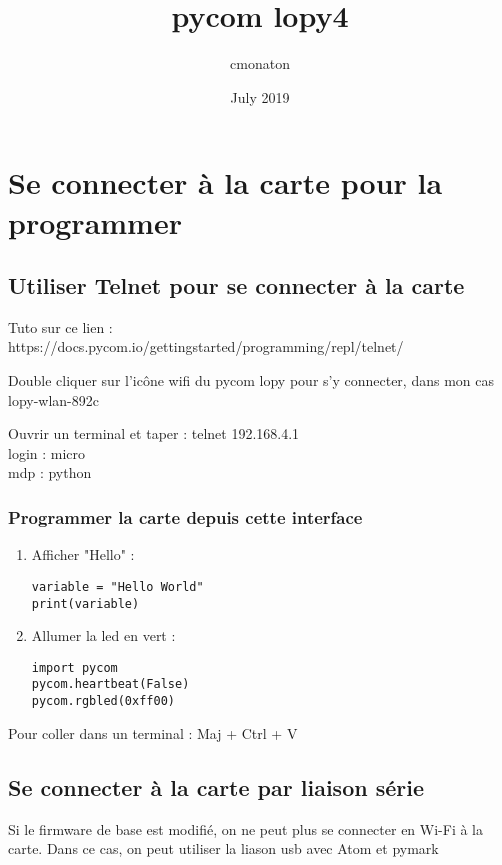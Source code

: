 \documentclass{article}
\title{pycom lopy4}
\author{cmonaton }
\date{July 2019}
\begin{document}
\maketitle

\section{Se connecter à la carte pour la programmer}

\subsection{Utiliser Telnet pour se connecter à la carte}

Tuto sur ce lien : https://docs.pycom.io/gettingstarted/programming/repl/telnet/

Double cliquer sur l'icône wifi du pycom lopy pour s'y connecter, dans mon cas lopy-wlan-892c

Ouvrir un terminal et taper : telnet 192.168.4.1 \\
login : micro \\
mdp : python \\

\subsubsection{Programmer la carte depuis cette interface}


\begin{enumerate}
    \item Afficher "Hello" : 
    \begin{verbatim}
variable = "Hello World"
print(variable) 
    \end{verbatim}

    \item Allumer la led en vert : 
    
 \begin{verbatim}
import pycom
pycom.heartbeat(False)
pycom.rgbled(0xff00)          
    \end{verbatim}
\end{enumerate}

Pour coller dans un terminal : Maj + Ctrl + V

\subsection{Se connecter à la carte par liaison série}
Si le firmware de base est modifié, on ne peut plus se connecter en Wi-Fi à la carte. 
Dans ce cas, on peut utiliser la liason usb avec Atom et pymark
\end{document}
